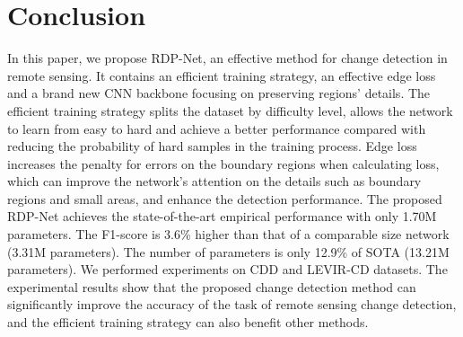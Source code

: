 \documentclass[lettersize,journal]{IEEEtran}
\begin{document}
\section{Conclusion}

In this paper, we propose RDP-Net, an effective method for change detection in remote sensing.
It contains an efficient training strategy, an effective edge loss and a brand new CNN backbone focusing on preserving regions' details.
The efficient training strategy splits the dataset by difficulty level, allows the network to learn from easy to hard and achieve a better performance compared with reducing the probability of hard samples in the training process.
Edge loss increases the penalty for errors on the boundary regions when calculating loss, which can improve the network's attention on the details such as boundary regions and small areas, and enhance the detection performance.
The proposed RDP-Net achieves the state-of-the-art empirical performance with only 1.70M parameters.
The F1-score is 3.6\% higher than that of a comparable size network (3.31M parameters).
The number of parameters is only 12.9\% of SOTA (13.21M parameters).
We performed experiments on CDD and LEVIR-CD datasets.
The experimental results show that the proposed change detection method can significantly improve the accuracy of the task of remote sensing change detection,
and the efficient training strategy can also benefit other methods.
















\vfill
\end{document}

